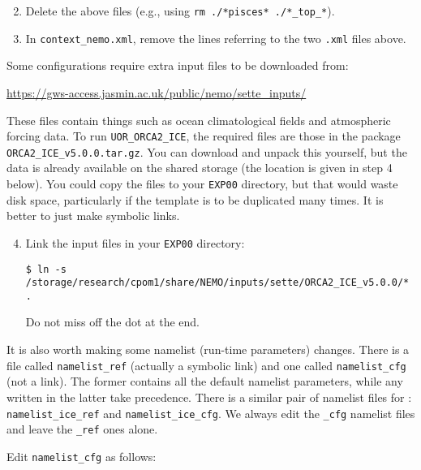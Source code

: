 \begin{enumerate}\setcounter{enumi}{1}
    \item Delete the above files (e.g., using \verb|rm ./*pisces* ./*_top_*|).
    \item In \verb|context_nemo.xml|, remove the lines referring to the two \verb|.xml| files above.
\end{enumerate}

Some \NEMOSIcu{} configurations require extra input files to be downloaded from:

\begin{center}
    \url{https://gws-access.jasmin.ac.uk/public/nemo/sette\_inputs/}
\end{center}

These files contain things such as ocean climatological fields and atmospheric forcing data.
To run \verb|UOR_ORCA2_ICE|, the required files are those in the package \verb|ORCA2_ICE_v5.0.0.tar.gz|.
You can download and unpack this yourself, but the data is already available on the shared storage (the location is given in step 4 below).
You could copy the files to your \verb|EXP00| directory, but that would waste disk space, particularly if the template is to be duplicated many times.
It is better to just make symbolic links.

\begin{enumerate}\setcounter{enumi}{3}
    \item Link the input files in your \verb|EXP00| directory:

\begingroup\small
\begin{verbatim}
$ ln -s /storage/research/cpom1/share/NEMO/inputs/sette/ORCA2_ICE_v5.0.0/* .
\end{verbatim}
\endgroup

    Do not miss off the dot at the end.

\end{enumerate}

It is also worth making some namelist (run-time parameters) changes.
There is a file called \verb|namelist_ref| (actually a symbolic link) and one called \verb|namelist_cfg| (not a link).
The former contains all the default namelist parameters, while any written in the latter take precedence.
There is a similar pair of namelist files for \SIcu{}: \verb|namelist_ice_ref| and \verb|namelist_ice_cfg|.
We always edit the \verb|_cfg| namelist files and leave the \verb|_ref| ones alone.

Edit \verb|namelist_cfg| as follows:

